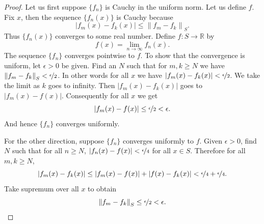 \documentclass[12pt,openany]{book}
\newcommand{\abs}[1]{\left\lvert {#1} \right\rvert}
\newcommand{\norm}[1]{\left\lVert {#1} \right\rVert}
\newcommand{\R}{{\mathbb{R}}}
\theoremstyle{plain}
\theoremstyle{remark}
\theoremstyle{definition}
\theoremstyle{exercise}
\theoremstyle{example}
\begin{document}
\begin{proof}
Let us first suppose $\{ f_n \}$ is Cauchy in the uniform norm.
Let us define $f$.  Fix $x$, then
the sequence $\{ f_n(x) \}$ is Cauchy because
\begin{equation*}
\abs{f_m(x)-f_k(x)}
\leq
\norm{f_m-f_k}_S .
\end{equation*}
Thus $\{ f_n(x) \}$ converges to some real number.  Define $f \colon S
\to \R$ by
\begin{equation*}
f(x) = \lim_{n \to \infty} f_n(x) .
\end{equation*}
The sequence
$\{ f_n \}$ converges pointwise to $f$.  To show that the convergence
is uniform, let $\epsilon > 0$ be given.  Find an $N$ such that
for $m, k \geq N$ we have
$\norm{f_m-f_k}_S < \nicefrac{\epsilon}{2}$.  In other words for
all $x$ we have
$\abs{f_m(x)-f_k(x)} < \nicefrac{\epsilon}{2}$.  We take the limit
as $k$ goes to infinity.  Then $\abs{f_m(x)-f_k(x)}$
goes to $\abs{f_m(x)-f(x)}$.
Consequently for all $x$ we get
\begin{equation*}
\abs{f_m(x)-f(x)} \leq \nicefrac{\epsilon}{2} < \epsilon .
\end{equation*}
And hence $\{ f_n \}$ converges uniformly.

For the other direction, suppose $\{ f_n \}$ converges uniformly to
$f$.  Given $\epsilon > 0$, find $N$ such that for all $n \geq N$,
$\abs{f_n(x)-f(x)} < \nicefrac{\epsilon}{4}$ for all $x \in S$.
Therefore for all $m, k \geq N$,
\begin{equation*}
\abs{f_m(x)-f_k(x)}
\leq
\abs{f_m(x)-f(x)}+\abs{f(x)-f_k(x)} < \nicefrac{\epsilon}{4} +
\nicefrac{\epsilon}{4} .
\end{equation*}
Take supremum over all $x$ to obtain
\begin{equation*}
\norm{f_m-f_k}_S \leq \nicefrac{\epsilon}{2} < \epsilon .  \qedhere
\end{equation*}
\end{proof}
\end{document}
